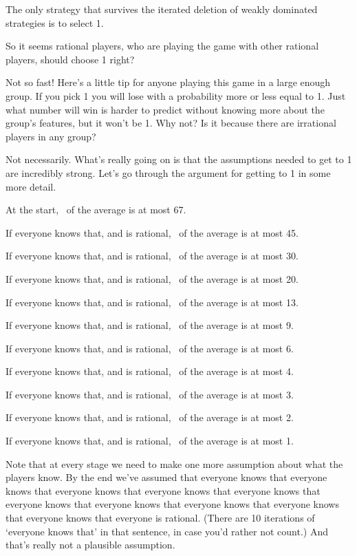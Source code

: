 \begin{itemize*}
\item The only strategy that survives the iterated deletion of weakly dominated strategies is to select 1.
\end{itemize*}

\noindent So it seems rational players, who are playing the game with other rational players, should choose 1 right?

Not so fast! Here's a little tip for anyone playing this game in a large enough group. If you pick 1 you will lose with a probability more or less equal to 1. Just what number will win is harder to predict without knowing more about the group's features, but it won't be 1. Why not? Is it because there are irrational players in any group?

Not necessarily. What's really going on is that the assumptions needed to get to 1 are incredibly strong. Let's go through the argument for getting to 1 in some more detail.

\begin{itemize*}
\item At the start, \twothirds\ of the average is at most 67.
\item If everyone knows that, and is rational, \twothirds\ of the average is at most 45.
\item If everyone knows that, and is rational, \twothirds\ of the average is at most 30.
\item If everyone knows that, and is rational, \twothirds\ of the average is at most 20.
\item If everyone knows that, and is rational, \twothirds\ of the average is at most 13.
\item If everyone knows that, and is rational, \twothirds\ of the average is at most 9.
\item If everyone knows that, and is rational, \twothirds\ of the average is at most 6.
\item If everyone knows that, and is rational, \twothirds\ of the average is at most 4.
\item If everyone knows that, and is rational, \twothirds\ of the average is at most 3.
\item If everyone knows that, and is rational, \twothirds\ of the average is at most 2.
\item If everyone knows that, and is rational, \twothirds\ of the average is at most 1.
\end{itemize*}

\noindent Note that at every stage we need to make one more assumption about what the players know. By the end we've assumed that everyone knows that everyone knows that everyone knows that everyone knows that everyone knows that everyone knows that everyone knows that everyone knows that everyone knows that everyone knows that everyone is rational. (There are 10 iterations of `everyone knows that' in that sentence, in case you'd rather not count.) And that's really not a plausible assumption.

